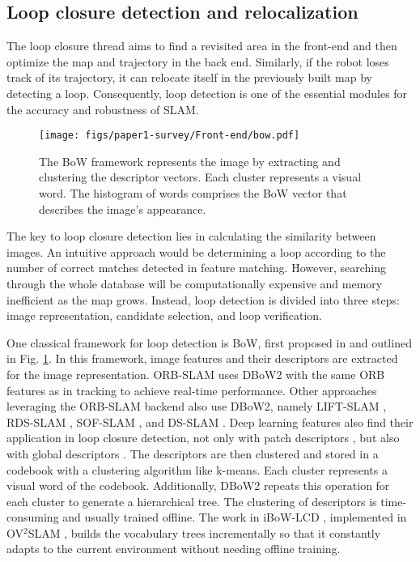 \subsection{Loop closure detection and relocalization}
\label{section:frontend:LoopClosure-relocalization}
The loop closure thread aims to find a revisited area in the front-end and then optimize the map and trajectory in the back end.
Similarly, if the robot loses track of its trajectory, it can relocate itself in the previously built map by detecting a loop. Consequently, loop detection is one of the essential modules for the accuracy and robustness of \ac{SLAM}.

\begin{figure}[tb]
  \centering
  \texttt{[image: figs/paper1-survey/Front-end/bow.pdf]}
  \caption[The visual Bag of Words framework]{The BoW framework represents the image by extracting
  and clustering the descriptor vectors. Each cluster represents a visual word. The histogram of words comprises the BoW vector that describes the image's appearance.}
  \label{fig:survey:bow}
\end{figure}


The key to loop closure detection lies in calculating the similarity between images. An intuitive approach would be determining a loop according to the number of correct matches detected in feature matching. However, searching through the whole database will be computationally expensive and memory inefficient as the map grows.
Instead, loop detection is divided into three steps: image representation, candidate selection, and loop verification.

One classical framework for loop detection is \ac{BoW}, first proposed in \cite{sivic2003bowzisserman} and outlined in Fig. \ref{fig:survey:bow}. In this framework, image features and their descriptors are extracted for the image representation. ORB-SLAM \cite{campos2021orb} uses DBoW2\cite{galvez2012dbow2}  with the same ORB features as in tracking to achieve real-time performance. Other approaches leveraging the ORB-SLAM backend also use DBoW2, namely LIFT-SLAM \cite{bruno2021lift}, RDS-SLAM \cite{liu2021rds-slam}, SOF-SLAM \cite{cui2019sof-slam}, and DS-SLAM \cite{yu2018ds-slam}. Deep learning features also find their application in loop closure detection, not only with patch descriptors \cite{LCDwithSuperpoint}, but also with global descriptors \cite{li2020dxslam,xu2021esa-vlad}.
The descriptors are then clustered and stored in a codebook with a clustering algorithm like k-means. Each cluster represents a visual word of the codebook. Additionally, DBoW2 \cite{galvez2012dbow2} repeats this operation for each cluster to generate a hierarchical tree. The clustering of descriptors is time-consuming and usually trained offline. The work in iBoW-LCD \cite{garcia2018ibow}, implemented in 
OV$^2$SLAM \cite{ferrera2021ov2slam}, builds the vocabulary trees incrementally so that it constantly adapts to the current environment without needing offline training.

